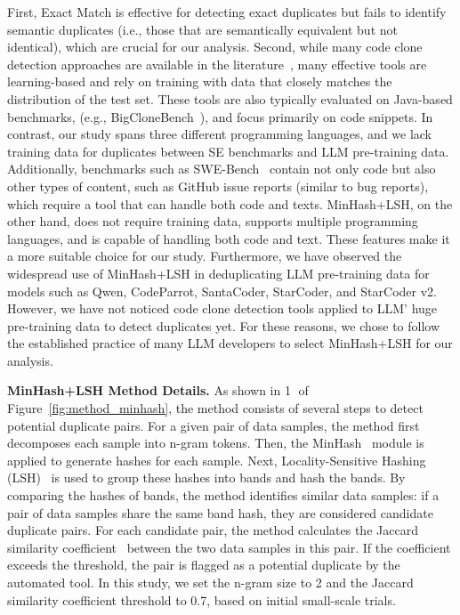 First, Exact Match is effective for detecting exact duplicates but fails to identify semantic duplicates (i.e., those that are semantically equivalent but not identical), which are crucial for our analysis. 
Second, while many code clone detection approaches are available in the literature~\cite{DBLP:journals/jss/NasrabadiPRRE23}, many effective tools are learning-based and rely on training with data that closely matches the distribution of the test set. These tools are also typically evaluated on Java-based benchmarks, (e.g., BigCloneBench~\cite{BigCloneBench}), and focus primarily on code snippets. 
In contrast, our study spans three different programming languages, and we lack training data for duplicates between SE benchmarks and LLM pre-training data. 
Additionally, benchmarks such as SWE-Bench~\cite{SWE-bench} contain not only code but also other types of content, such as GitHub issue reports (similar to bug reports), which require a tool that can handle both code and texts.
MinHash+LSH, on the other hand, does not require training data, supports multiple programming languages, and is capable of handling both code and text. These features make it a more suitable choice for our study.
Furthermore, we have observed the widespread use of MinHash+LSH in deduplicating LLM pre-training data for models such as Qwen, CodeParrot, SantaCoder, StarCoder, and StarCoder v2. However, we have not noticed code clone detection tools applied to LLM' huge pre-training data to detect duplicates yet. For these reasons, we chose to follow the established practice of many LLM developers to select MinHash+LSH for our analysis.





\vspace{0.2cm}
\noindent\textbf{MinHash+LSH Method Details.}
As shown in \textcircled{1} of Figure~\ref{fig:method_minhash}, the method consists of several steps to detect potential duplicate pairs. For a given pair of data samples, the method first decomposes each sample into n-gram tokens. Then, the MinHash~\cite{DBLP:conf/cpm/Broder00} module is applied to generate hashes for each sample. Next, Locality-Sensitive Hashing (LSH)~\cite{LSH} is used to group these hashes into bands and hash the bands. By comparing the hashes of bands, the method identifies similar data samples: if a pair of data samples share the same band hash, they are considered candidate duplicate pairs.
For each candidate pair, the method calculates the Jaccard similarity coefficient~\cite{Jaccard_index} between the two data samples in this pair. If the coefficient exceeds the threshold, the pair is flagged as a potential duplicate by the automated tool. In this study, we set the n-gram size to 2 and the Jaccard similarity coefficient threshold to 0.7, based on initial small-scale trials.








